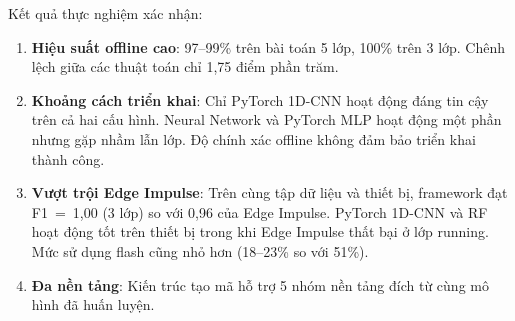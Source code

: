 Kết quả thực nghiệm xác nhận:
\begin{enumerate}
    \item \textbf{Hiệu suất offline cao}: 97--99\% trên bài toán 5 lớp, 100\% trên 3 lớp. Chênh lệch giữa các thuật toán chỉ 1,75 điểm phần trăm.
    \item \textbf{Khoảng cách triển khai}: Chỉ PyTorch 1D-CNN hoạt động đáng tin cậy trên cả hai cấu hình. Neural Network và PyTorch MLP hoạt động một phần nhưng gặp nhầm lẫn lớp. Độ chính xác offline không đảm bảo triển khai thành công.
    \item \textbf{Vượt trội Edge Impulse}: Trên cùng tập dữ liệu và thiết bị, framework đạt F1~=~1,00 (3 lớp) so với 0,96 của Edge Impulse. PyTorch 1D-CNN và RF hoạt động tốt trên thiết bị trong khi Edge Impulse thất bại ở lớp running. Mức sử dụng flash cũng nhỏ hơn (18--23\% so với 51\%).
    \item \textbf{Đa nền tảng}: Kiến trúc tạo mã hỗ trợ 5 nhóm nền tảng đích từ cùng mô hình đã huấn luyện.
\end{enumerate}

